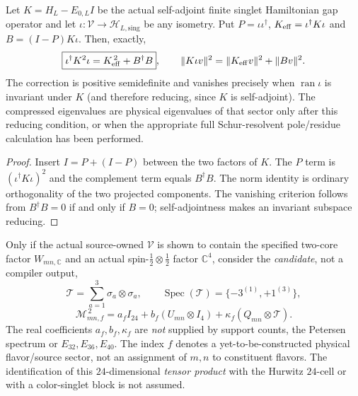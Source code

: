 \documentclass[12pt,a4paper]{article}
\begin{document}
\begin{theorem}
\label{p10:thm:v327-compression-leakage-pythagoras}
Let $K=H_L-E_{0,L}I$ be the actual self-adjoint finite singlet
Hamiltonian gap operator and let $\iota:\mathcal V\to
\mathcal H_{L,\mathrm{sing}}$ be any isometry. Put
$P=\iota\iota^\dagger$, $K_{\rm eff}=\iota^\dagger K\iota$
and $B=(I-P)K\iota$. Then, exactly,
\[
 \boxed{\iota^\dagger K^2\iota=K_{\rm eff}^{\,2}+B^\dagger B},
 \qquad
 \|K\iota v\|^2=\|K_{\rm eff}v\|^2+\|Bv\|^2.
\]
The correction is positive semidefinite and vanishes precisely when
$\operatorname{ran}\iota$ is invariant under $K$ (and therefore
reducing, since $K$ is self-adjoint).
The compressed eigenvalues are physical eigenvalues of that sector
only after this reducing condition, or when the appropriate full
Schur-resolvent pole/residue calculation has been performed.
\end{theorem}
\begin{proof}
Insert $I=P+(I-P)$ between the two factors of $K$.
The $P$ term is $(\iota^\dagger K\iota)^2$ and the
complement term equals $B^\dagger B$.
The norm identity is ordinary orthogonality of the two projected
components. The vanishing criterion follows from $B^\dagger B=0$
if and only if $B=0$; self-adjointness makes an invariant subspace
reducing.
\end{proof}

\begin{definition}
\label{p10:def:v327-conditional-pair-spin-block}
Only if the actual source-owned $\mathcal V$ is shown to contain the
specified two-core factor $W_{mn,\mathbb C}$ and an actual
spin-$\tfrac12\otimes\tfrac12$ factor $\mathbb C^4$,
consider the \emph{candidate}, not a compiler output,
\[
 \mathcal T=\sum_{a=1}^3\sigma_a\otimes\sigma_a,
 \qquad \operatorname{Spec}(\mathcal T)=\{-3^{(1)},+1^{(3)}\},
\]
\[
 \mathscr M_{mn,f}^{\,2}
 =a_f I_{24}+b_f (U_{mn}\otimes I_4)
 +\kappa_f(Q_{mn}\otimes\mathcal T).
\]
The real coefficients $a_f,b_f,\kappa_f$ are \emph{not} supplied by
support counts, the Petersen spectrum or $E_{32},E_{36},E_{40}$.
The index $f$ denotes a yet-to-be-constructed physical flavor/source
sector, not an assignment of $m,n$ to constituent flavors.
The identification of this $24$-dimensional \emph{tensor product}
with the Hurwitz $24$-cell or with a color-singlet block is not assumed.
\end{definition}
\end{document}
